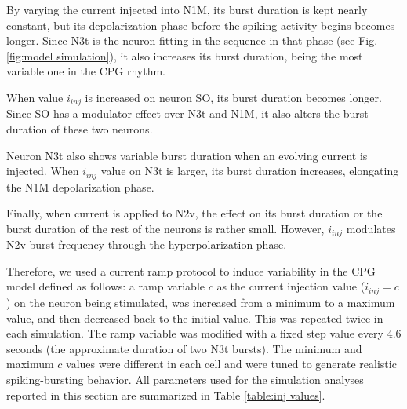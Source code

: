 By varying the current injected into N1M, its burst duration is kept nearly constant, but its depolarization phase before the spiking activity begins becomes longer. Since N3t is the neuron fitting in the sequence in that phase (see Fig. \ref{fig:model simulation}), it also increases its burst duration, being the most variable one in the CPG rhythm. 

When value \(i_{inj}\) is increased on neuron SO, its burst duration becomes longer. Since SO has a modulator effect over N3t and N1M, it also alters the burst duration of these two neurons.

Neuron N3t also shows variable burst duration when an evolving current is injected. When \(i_{inj}\) value on N3t is larger, its burst duration increases, elongating the N1M depolarization phase.  

Finally, when current is applied to N2v, the effect on its burst duration or the burst duration of the rest of the neurons is rather small. However, \(i_{inj}\) %
modulates N2v burst frequency through the hyperpolarization phase. 

Therefore, we used a current ramp protocol to induce variability in the CPG model defined as follows: a ramp variable $c$ as the current injection value ($i_{inj}=c$) on the neuron being stimulated, was increased from a minimum to a maximum value, and then decreased back to the initial value. This was repeated twice in each simulation. The ramp variable was modified with a fixed step value every 4.6 seconds (the approximate duration of two N3t bursts). The minimum and maximum $c$ values were different in each cell and were tuned to generate realistic spiking-bursting behavior. All parameters used for the simulation analyses reported in this section are summarized in Table \ref{table:inj values}.

